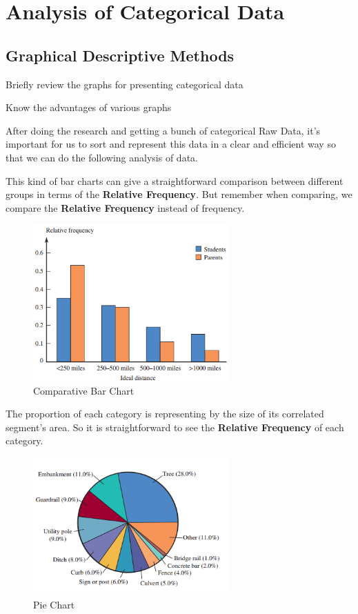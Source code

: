 \section{Analysis of Categorical Data}

\subsection{Graphical Descriptive Methods}
\begin{objectives}
\item Briefly review the graphs for presenting categorical data
\item Know the advantages of various graphs
\end{objectives}
\vbox{}
After doing the research and getting a bunch of categorical Raw Data, it's important for us to sort and represent this data in a clear and efficient way so that we can do the following analysis of data.\\
\begin{Center}
\end{Center}
This kind of bar charts can give a straightforward comparison between different groups in terms of the \textbf{Relative Frequency}. But remember when comparing, we compare the \textbf{Relative Frequency} instead of frequency.
\begin{figure}[H]
            \centering
            \includegraphics[width=75mm]{cbc.png}
            \caption{Comparative Bar Chart}
            \label{Comparative Bar Chart}
        \end{figure}
\begin{Center}
\end{Center}
The proportion of each category is representing by the size of its correlated segment's area. So it is straightforward to see the \textbf{Relative Frequency} of each category.
        \begin{figure}[H]
            \centering
            \includegraphics[width=75mm]{pie_chart.png}
            \caption{Pie Chart}
            \label{pie chart}
        \end{figure}
